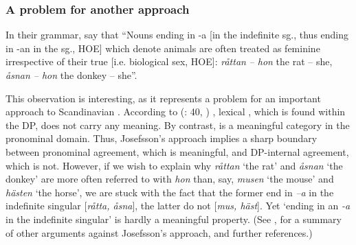 \documentclass[output=paper]{langsci/langscibook}
\begin{document}
\begin{exe}
\begin{xlist}
\begin{xlist}
\subsubsection{A problem for another approach}

In their  grammar, %
\citet[4]{Holmes13} %
%
say that
``Nouns ending in -a {[}in the indefinite sg., thus ending in -an in the
 sg., HOE{]} which denote animals are often treated as feminine
irrespective of their true  {[}i.e. biological sex, HOE{]}:
\emph{råttan} \emph{-- hon} the rat -- she, \emph{åsnan -- hon} the
donkey -- she''.

This observation is interesting, as it represents a problem for an
important approach to Scandinavian . According to %
\citeauthor{Josefsson09} (\citeyear{Josefsson09}: 40, \citeyear{Josefsson14b})%
%
, lexical , which is found within the DP, does not carry
any meaning. By contrast,  is a meaningful category in the
pronominal domain. Thus, Josefsson's approach implies a sharp boundary
between pronominal agreement, which is meaningful, and DP-internal
agreement, which is not. However, if we wish to explain why 
\emph{råttan} `the rat' and \emph{åsnan} `the donkey' are more often
referred to with \emph{hon} than, say, \emph{musen} `the mouse' and
\emph{hästen} `the horse', we are stuck with the fact that the former
end in \emph{--a} in the indefinite singular {[}\emph{råtta, åsna}{]},
the latter do not {[}\emph{mus, häst}{]}. Yet `ending in an \emph{-a} in
the indefinite singular' is hardly a meaningful property. (See %
\citealt{Haugen17}%
%
, for a summary of other arguments against Josefsson's
approach, and further references.)


\end{xlist}
\end{xlist}
\end{exe}
\end{document}
